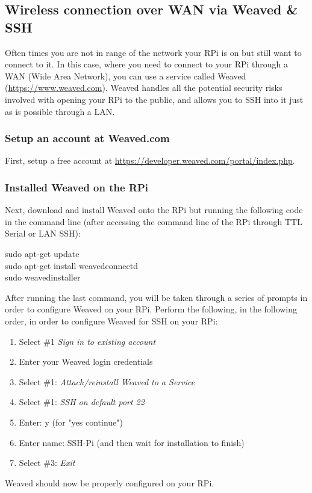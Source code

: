 \documentclass{article}
\newcommand*{\myfont}{\fontfamily{pcr}\selectfont}
\newcommand{\codeb}[2]{
  \begin{tcolorbox}[width=\textwidth,colback={SpringGreen},title={#1},colbacktitle=darkgreen,coltitle=SpringGreen]
    \myfont
    #2
  \end{tcolorbox}
} %
\begin{document}
  \subsection{Wireless connection over WAN via Weaved \& SSH}
  \label{sec:connect-sshwan}
    Often times you are not in range of the network your RPi is on but still want to connect to it. In this case, where you need to connect to your RPi through a WAN (Wide Area Network), you can use a service called Weaved (\href{https://www.weaved.com}{https://www.weaved.com}). Weaved handles all the potential security risks involved with opening your RPi to the public, and allows you to SSH into it just as is possible through a LAN.
    \subsubsection{Setup an account at Weaved.com}
    First, setup a free account at \href{https://developer.weaved.com/portal/index.php}{https://developer.weaved.com/portal/index.php}.
    \subsubsection{Installed Weaved on the RPi}
    Next, download and install Weaved onto the RPi but running the following code in the command line (after accessing the command line of the RPi through TTL Serial or LAN SSH):
    \codeb{Download and install Weaved to the RPi}
    {
      sudo apt-get update \\
      sudo apt-get install weavedconnectd \\
      sudo weavedinstaller \\
    }
    After running the last command, you will be taken through a series of prompts in order to configure Weaved on your RPi. Perform the following, in the following order, in order to configure Weaved for SSH on your RPi:
    \begin{enumerate}
      \item Select \#1 \textit{Sign in to existing account}
      \item Enter your Weaved login credentials
      \item Select \#1: \textit{Attach/reinstall Weaved to a Service}
      \item Select \#1: \textit{SSH on default port 22}
      \item Enter: y (for "yes continue")
      \item Enter name: SSH-Pi (and then wait for installation to finish)
      \item Select \#3: \textit{Exit}
    \end{enumerate}
    Weaved should now be properly configured on your RPi.
\end{document}
